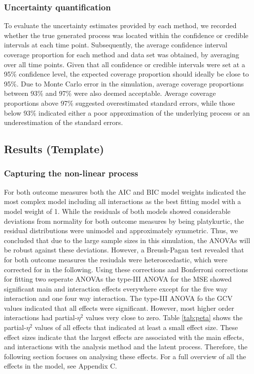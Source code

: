 \documentclass[man, floatsintext]{apa7}
\begin{document}
\subsubsection{Uncertainty quantification}

To evaluate the uncertainty estimates provided by each method, we recorded
whether the true generated process was located within the confidence or
credible intervals at each time point.
Subsequently, the average
confidence interval coverage proportion for each method and data set was
obtained, by averaging over all time points.
Given that all confidence or credible intervals were set at a
95\% confidence level, the expected coverage proportion should ideally be
close to 95\%. Due to Monte Carlo error in the simulation, average coverage
proportions between 93\% and 97\% were also deemed acceptable.
Average coverage proportions above 97\% suggested overestimated standard
errors,
while those below 93\% indicated either a poor approximation of the underlying
process or an underestimation of the standard errors.

\subsection{Results (Template)}

\subsubsection{Capturing the non-linear process}

For both outcome measures both the AIC and BIC model weights indicated the
most complex model including all interactions as the best fitting model with a
model weight of 1. While the residuals of both models showed considerable
deviations from normality for both outcome measures by being platykurtic,
the residual distributions were unimodel and approximately symmetric. Thus,
we concluded that due to the large sample sizes in this simulation, the ANOVAs
will be robust against these deviations. However, a Breush-Pagan test revealed
that for both outcome measures the resiudals were heteroscedastic, which
were corrected for in the following. Using these corrections and Bonferroni
corrections for fitting two seperate ANOVAs the type-III ANOVA for the MSE
showed significant main and interaction effects everywhere except for the five
way interaction and one four way interaction. The type-III ANOVA fo the GCV
values indicated that all effects were significant. However, most higher order
interactions had partial-$\eta^2$ values very close to zero. Table
\ref{tab:peta} shows the partial-$\eta^2$ values of all effects that indicated
at least a small effect size. These effect sizes indicate that the largest
effects are associated with the main effects, and interactions with
the analysis method and the latent process. Therefore, the following
section focuses on analysing these effects. For a full overview of all the
effects in the model, see Appendix C.
\end{document}
